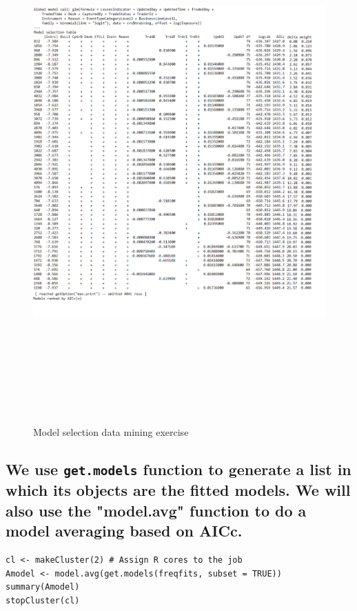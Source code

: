 \documentclass{DissertateUSU}
\begin{document}
\begin{figure}
\centering
\includegraphics[height=20cm, width=15cm]{Dredge_bin.pdf}
\caption[Data dredging]{Model selection data mining exercise}
\label{Dredge}
\end{figure}

\subsection{We use \texttt{get.models} function to generate a list in which its objects are the fitted models. We will also use the "model.avg" function to do a model averaging based on AICc.}
\label{sec:Model averaging function}

\small

\begin{verbatim}
cl <- makeCluster(2) # Assign R cores to the job 
Amodel <- model.avg(get.models(freqfits, subset = TRUE))
summary(Amodel)
stopCluster(cl) 
\end{verbatim}
\end{document}
